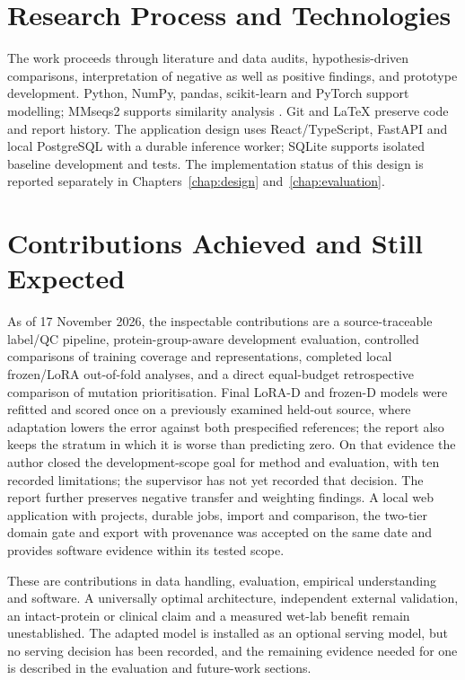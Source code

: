 \section{Research Process and Technologies}
The work proceeds through literature and data audits, hypothesis-driven comparisons, interpretation
of negative as well as positive findings, and prototype development. Python, NumPy, pandas,
scikit-learn and PyTorch support modelling; MMseqs2 supports similarity analysis
\citep{steinegger2017}. Git and \LaTeX{} preserve code and report history. The application design uses
React/TypeScript, FastAPI and local PostgreSQL with a durable inference worker; SQLite supports
isolated baseline development and tests. The implementation status of this design is reported
separately in Chapters~\ref{chap:design} and~\ref{chap:evaluation}.

\section{Contributions Achieved and Still Expected}
As of 17 November 2026, the inspectable contributions are a source-traceable label/QC pipeline,
protein-group-aware development evaluation, controlled comparisons of training coverage and
representations, completed local frozen/LoRA out-of-fold analyses, and a direct equal-budget
retrospective comparison of mutation prioritisation. Final LoRA-D and frozen-D models were refitted
and scored once on a previously examined held-out source, where adaptation lowers the error against
both prespecified references; the report also keeps the stratum in which it is worse than predicting
zero. On that evidence the author closed the development-scope goal for method and evaluation, with
ten recorded limitations; the supervisor has not yet recorded that decision. The report further
preserves negative transfer and weighting findings. A local web application with projects, durable
jobs, import and comparison, the two-tier domain gate and export with provenance was accepted on the
same date and provides software evidence within its tested scope.

These are contributions in data handling, evaluation, empirical understanding and software. A
universally optimal architecture, independent external validation, an intact-protein or clinical
claim and a measured wet-lab benefit remain unestablished. The adapted model is installed as an
optional serving model, but no serving decision has been recorded, and the remaining evidence needed
for one is described in the evaluation and future-work sections.

